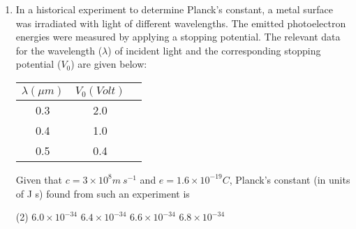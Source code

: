 
\begin{enumerate}
    \item In a historical experiment to determine Planck's constant, a metal surface was irradiated with light of different wavelengths. The emitted photoelectron energies were measured by applying a stopping potential. The relevant data for the wavelength (\(\lambda\)) of incident light and the corresponding stopping potential (\(V_0\)) are given below:
    \begin{center}
        \begin{tabular}{ccc}
        \hline
        \(\lambda (\mu m)\) & \(V_0 (Volt)\) \\
        \hline
        0.3 & 2.0 \\
        0.4 & 1.0 \\
        0.5 & 0.4 \\
        \hline
        \end{tabular}
    \end{center}
    Given that \( c = 3 \times 10^8 m\ s^{-1} \) and \( e = 1.6 \times 10^{-19} C \), Planck's constant (in units of J s) found from such an experiment is
    \begin{tasks}(2)
        \task \( 6.0 \times 10^{-34} \)
        \task \( 6.4 \times 10^{-34} \)
        \task \( 6.6 \times 10^{-34} \)
        \task \( 6.8 \times 10^{-34} \)
    \end{tasks}
\end{enumerate}
